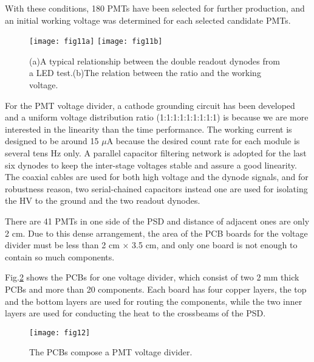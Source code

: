 \documentclass[preprint]{elsarticle}
\begin{document}
With these conditions, 180 PMTs have been selected for further production, and an initial working voltage was determined for each selected candidate PMTs.


\begin{figure}[!ht]
	\centering
	\texttt{[image: fig11a]}
	\texttt{[image: fig11b]}
	\caption{(a)A typical relationship between the double readout dynodes from a LED test.(b)The relation between the ratio and the working voltage.}
    \label{fig:fig11}
\end{figure}


For the PMT voltage divider, a cathode grounding circuit has been developed and a uniform voltage distribution ratio (1:1:1:1:1:1:1:1:1) is because we are more interested in the linearity than the time performance. The working current is designed to be around 15 $\mu$A because the desired count rate for each module is several tens Hz only. A parallel capacitor filtering network is adopted for the last six dynodes to keep the inter-stage voltages stable and assure a good linearity. The coaxial cables are used for both high voltage and the dynode signals, and for robustness reason, two serial-chained capacitors instead one are used for isolating the HV to the ground and the two readout dynodes.

There are 41 PMTs in one side of the PSD and distance of adjacent ones are only 2 cm. Due to this dense arrangement, the area of the PCB boards for the voltage divider must be less than 2 cm $\times$ 3.5 cm, and only one board is not enough to contain so much components.

Fig.\ref{fig:fig12} shows the PCBs for one voltage divider, which consist of two 2 mm thick PCBs and more than 20 components. Each board has four copper layers, the top and the bottom layers are used for routing the components, while the two inner layers are used for conducting the heat to the crossbeams of the PSD.

\begin{figure}
 \centering
 \texttt{[image: fig12]}
\caption{The PCBs compose a PMT voltage divider.}
\label{fig:fig12}
\end{figure}
\end{document}
